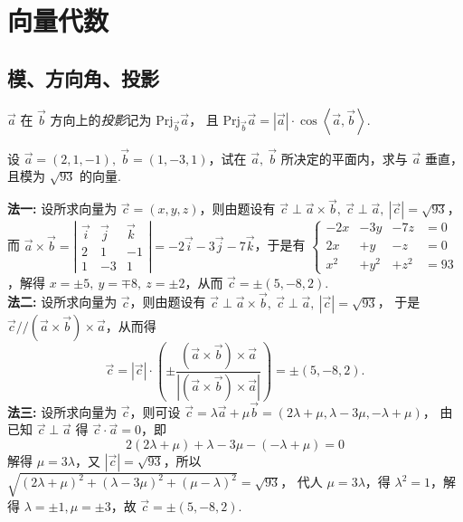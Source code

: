 \section{向量代数}

\subsection{模、方向角、投影}

\begin{definition}[投影]
    $\vec{a}$ 在 $\vec{b}$ 方向上的\textit{投影}记为 $\mathrm{Prj}_{\vec{b} } \vec{a}$，
    且 $\mathrm{Prj}_{\vec{b} } \vec{a}=|\vec{a}| \cdot \cos\left \langle \vec{a},\vec{b} \right \rangle .$
\end{definition}

\begin{example}
    设 $\vec{a}=(2,1,-1),~\vec{b}=(1,-3,1)$，试在 $\vec{a},~\vec{b}$ 所决定的平面内，求与 $\vec{a}$ 垂直，且模为 $\sqrt{93}$ 的向量.
\end{example}
\begin{solution}
    \textbf{法一: }设所求向量为 $ \vec{c}=(x, y, z)$，则由题设有 $ \vec{c} \perp \vec{a} \times \vec{b},~ \vec{c} \perp \vec{a},~|\vec{c}|=\sqrt{93}$，
    而 $ \vec{a} \times \vec{b}=\left|\begin{array}{ccc}\vec{i} & \vec{j} & \vec{k} \\ 2 & 1 & -1 \\ 1 & -3 & 1\end{array}\right|=-2 \vec{i}-3 \vec{j}-7 \vec{k}$，于是有
    $\left\{\begin{array}{llll}
            -2x & -3y  & -7z  & =0  \\
            2x  & +y   & -z   & =0  \\
            x^2 & +y^2 & +z^2 & =93
        \end{array}\right.$，解得 $ x=\pm 5,~ y=\mp 8,~ z=\pm 2 $，从而 $ \vec{c}=\pm(5,-8,2) .$\\
    \textbf{法二: }设所求向量为 $ \vec{c}$，则由题设有 $ \vec{c} \perp \vec{a} \times \vec{b},~ \vec{c} \perp \vec{a},~|\vec{c}|=\sqrt{93}$，
    于是 $ \vec{c} / /(\vec{a} \times \vec{b}) \times \vec{a}$，从而得
    $$ \vec{c}=\left|\vec{c}\right| \cdot\left(\pm \frac{(\vec{a} \times \vec{b}) \times \vec{a}}{|(\vec{a} \times \vec{b}) \times \vec{a}|}\right)=\pm(5,-8,2) .$$
    \textbf{法三: }设所求向量为 $ \vec{c}$，则可设 $ \vec{c}=\lambda \vec{a}+\mu \vec{b}=(2 \lambda+\mu, \lambda-3 \mu,-\lambda+\mu)$，
    由已知 $ \vec{c} \perp \vec{a} $ 得 $ \vec{c} \cdot \vec{a}=0$，即 $$ 2(2 \lambda+\mu)+\lambda-3 \mu-(-\lambda+\mu)=0$$
    解得 $ \mu=3 \lambda$，又 $ |\vec{c}|=\sqrt{93}$，所以 $ \sqrt{(2 \lambda+\mu)^{2}+(\lambda-3 \mu)^{2}+(\mu-\lambda)^{2}}=\sqrt{93}$，
    代人 $ \mu=3 \lambda$，得 $ \lambda^{2}=1$，解得 $ \lambda=\pm 1, \mu=\pm 3$，故 $ \vec{c}=\pm(5,-8,2) .$
\end{solution}

